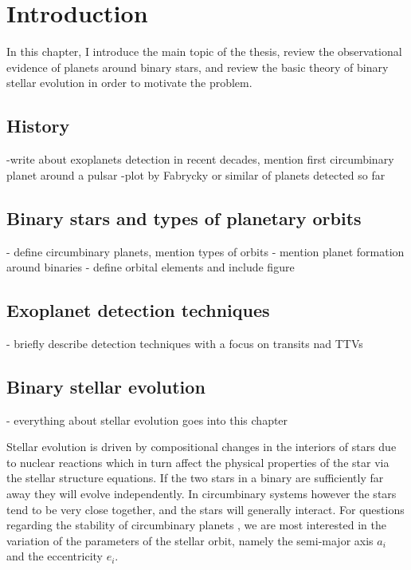 \chapter{Introduction}\label{ch:introduction}
In this chapter, I introduce the main topic of the thesis, review the 
observational evidence of planets around binary stars, and review the 
basic theory of binary stellar evolution in order to motivate the problem.

\section{History}
\label{sec:History}
-write about exoplanets detection in recent
decades, mention first circumbinary planet around a pulsar
-plot by Fabrycky or similar of planets detected so far

\section{Binary stars and types of planetary orbits}
\label{sec:Binary_stars_and_types_of_planetary_orbits}
- define circumbinary planets, mention types of orbits
- mention planet formation around binaries
- define orbital elements and include figure

\section{Exoplanet detection techniques}
\label{sec:Exoplanet detection techniques}
- briefly describe detection techniques with a 
focus on transits nad TTVs

\section{Binary stellar evolution}
\label{sec:stellar_evolution}
- everything about stellar evolution goes into this chapter

Stellar evolution
is driven by compositional changes in the interiors of stars due to nuclear 
reactions which in turn affect the physical properties of the star 
via the stellar structure equations. If the two stars in a binary are 
sufficiently far away they will evolve independently. In circumbinary systems
however the stars tend to be very close together, and the stars will generally
interact. For questions regarding the stability of circumbinary planets
, we are most interested in the variation of the parameters of the stellar 
orbit, namely the semi-major axis $a_i$ and
the eccentricity $e_i$. 

